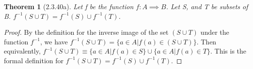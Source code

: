 \documentclass[a4paper, 12pt]{article}
\theoremstyle{plain}
\newtheorem*{theorem*}{Theorem}
\begin{document}
	
	\begin{theorem*}[2.3.40a]
		Let f be the function $f: A \implies B$. Let S, and T be subsets of B. $f^{-1}(S \cup T) = f^{-1}(S) \cup f^{-1}(T)$.
	\end{theorem*}
	
	\begin{proof}
		By the definition for the inverse image of the set $(S \cup T)$ under the function $f^{-1}$, we have $f^{-1}(S \cup T) = \{a \in A | f(a) \in (S \cup T)\}$. Then equivalently, $f^{-1}(S \cup T) \equiv \{a \in A | f(a) \in S\} \cup \{a \in A | f(a) \in T\}$. This is the formal definition for $f^{-1}(S \cup T) = f^{-1}(S) \cup f^{-1}(T)$.
	\end{proof}
\end{document}
